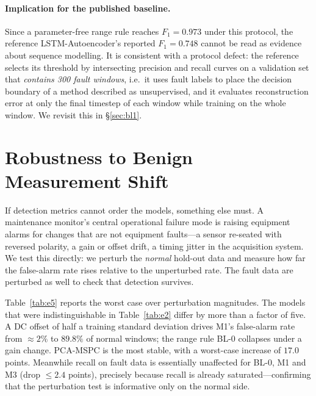\documentclass{article}
\begin{document}
\paragraph{Implication for the published baseline.} Since a parameter-free
range rule reaches $F_1 = 0.973$ under this protocol, the reference
LSTM-Autoencoder's reported $F_1 = 0.748$ cannot be read as evidence about
sequence modelling. It is consistent with a protocol defect: the reference
selects its threshold by intersecting precision and recall curves on a
validation set that \emph{contains 300 fault windows}, i.e.\ it uses fault
labels to place the decision boundary of a method described as unsupervised,
and it evaluates reconstruction error at only the final timestep of each
window while training on the whole window. We revisit this in \S\ref{sec:bl1}.

\section{Robustness to Benign Measurement Shift}
\label{sec:robust}

If detection metrics cannot order the models, something else must. A
maintenance monitor's central operational failure mode is raising equipment
alarms for changes that are not equipment faults---a sensor re-seated with
reversed polarity, a gain or offset drift, a timing jitter in the acquisition
system. We test this directly: we perturb the \emph{normal} hold-out data and
measure how far the false-alarm rate rises relative to the unperturbed rate.
The fault data are perturbed as well to check that detection survives.

Table~\ref{tab:e5} reports the worst case over perturbation magnitudes. The
models that were indistinguishable in Table~\ref{tab:e2} differ by more than a
factor of five. A DC offset of half a training standard deviation drives M1's
false-alarm rate from $\approx\!2\%$ to $89.8\%$ of normal windows; the range
rule BL-0 collapses under a gain change. PCA-MSPC is the most stable, with a
worst-case increase of $17.0$ points. Meanwhile recall on fault data is
essentially unaffected for BL-0, M1 and M3 (drop $\le 2.4$ points), precisely
because recall is already saturated---confirming that the perturbation test is
informative only on the normal side.
\end{document}
